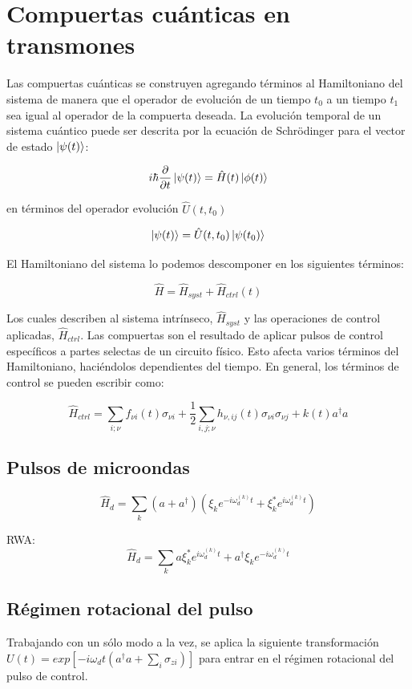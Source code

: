 \section{Compuertas cuánticas en transmones}

Las compuertas cuánticas se construyen agregando términos al Hamiltoniano del sistema de manera que el operador de evolución de un tiempo $t_0$ a un tiempo $t_1$ sea igual al operador de la compuerta deseada. La evolución temporal de un sistema cuántico puede ser descrita por la ecuación de Schrödinger para el vector de estado $\ket{\psi(t)}$:

\[
i \hbar \frac{\partial}{\partial t} \ket{\psi(t)} = \hat{H}(t) \ket{\phi(t)}
\]

en términos del operador evolución $\hat{U}(t,t_0)$

\[
\ket{\psi(t)} = \hat{U}(t,t_0) \ket{\psi(t_0)}
\]

El Hamiltoniano del sistema lo podemos descomponer en los siguientes términos:

\[
\hat{H} = \hat{H}_{syst} + \hat{H}_{ctrl}(t)
\]

Los cuales describen al sistema intrínseco, $\hat{H}_{syst}$ y las operaciones de control aplicadas, $\hat{H}_{ctrl}$. Las compuertas son el resultado de aplicar pulsos de control específicos a partes selectas de un circuito físico. Esto afecta varios términos del Hamiltoniano, haciéndolos dependientes del tiempo. En general, los términos de control se pueden escribir como:

\[
\hat{H}_{ctrl} = \sum\limits_{i; \nu} f_{\nu i}(t) \sigma_{\nu i} + \frac{1}{2} \sum\limits_{i,j;\nu} h_{\nu, ij}(t) \sigma_{\nu i} \sigma_{\nu j} + k(t) a^\dag a
\]

\subsection{Pulsos de microondas}

$$\hat{H}_d = \sum\limits_k (a+a^\dagger) (\xi_k e^{-i\omega_d^{(k)}t} + \xi_k^*e^{i\omega_d^{(k)}t})$$

RWA: $$\hat{H}_d=\sum\limits_k a\xi_k^*e^{i\omega_d^{(k)}t}+ a^\dagger\xi_ke^{-i\omega_d^{(k)}t}$$

\subsection{Régimen rotacional del pulso}

Trabajando con un sólo modo a la vez, se aplica la siguiente transformación $U(t) = exp[-i \omega_d t(a^\dagger a + \sum\limits_i \sigma_{z i})]$ para entrar en el régimen rotacional del pulso de control.

